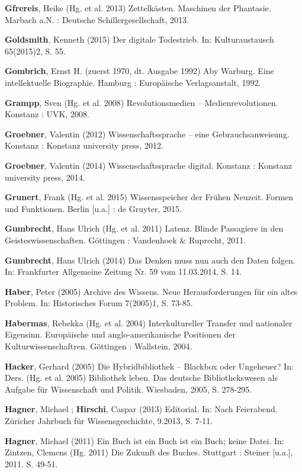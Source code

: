 \documentclass[a4paper,
fontsize=11pt,
oneside,
numbers=noperiodatend,
parskip=half-,
bibliography=totoc,
final
]{scrartcl}
\begin{document}
\textbf{Gfrereis}, Heike (Hg. et al. 2013) Zettelkästen. Maschinen der
Phantasie. Marbach a.N. : Deutsche Schillergesellschaft, 2013.

\textbf{Goldsmith}, Kenneth (2015) Der digitale Todestrieb. In:
Kulturaustausch 65(2015)2, S. 55.

\textbf{Gombrich}, Ernst H. (zuerst 1970, dt. Ausgabe 1992) Aby Warburg.
Eine intellektuelle Biographie. Hamburg : Europäische Verlagsanstalt,
1992.

\textbf{Grampp}, Sven (Hg. et al. 2008) Revolutionsmedien --
Medienrevolutionen. Konstanz : UVK, 2008.

\textbf{Groebner}, Valentin (2012) Wissenschaftssprache -- eine
Gebrauchsanweisung. Konstanz : Konstanz university press, 2012.

\textbf{Groebner}, Valentin (2014) Wissenschaftssprache digital.
Konstanz : Konstanz university press, 2014.

\textbf{Grunert}, Frank (Hg. et al. 2015) Wissensspeicher der Frühen
Neuzeit. Formen und Funktionen. Berlin {[}u.a.{]} : de Gruyter, 2015.

\textbf{Gumbrecht}, Hans Ulrich (Hg. et al. 2011) Latenz. Blinde
Passagiere in den Geisteswissenschaften. Göttingen : Vandenhoek \&
Ruprecht, 2011.

\textbf{Gumbrecht}, Hans Ulrich (2014) Das Denken muss nun auch den
Daten folgen. In: Frankfurter Allgemeine Zeitung Nr. 59 vom 11.03.2014,
S. 14.

\textbf{Haber}, Peter (2005) Archive des Wissens. Neue Herausforderungen
für ein altes Problem. In: Historisches Forum 7(2005)1, S. 73-85.

\textbf{Habermas}, Rebekka (Hg. et al. 2004) Interkultureller Transfer
und nationaler Eigensinn. Europäische und anglo-amerikanische Positionen
der Kulturwissenschaftren. Göttingen : Wallstein, 2004.

\textbf{Hacker}, Gerhard (2005) Die Hybridbibliothek -- Blackbox oder
Ungeheuer? In: Ders. (Hg. et al. 2005) Bibliothek leben. Das deutsche
Bibliothekswesen als Aufgabe für Wissenschaft und Politik. Wiesbaden,
2005, S. 278-295.

\textbf{Hagner}, Michael ; \textbf{Hirschi}, Caspar (2013) Editorial.
In: Nach Feierabend. Züricher Jahrbuch für Wissensgeschichte, 9.2013, S.
7-11.

\textbf{Hagner}, Michael (2011) Ein Buch ist ein Buch ist ein Buch;
keine Datei. In: Zintzen, Clemens (Hg. 2011) Die Zukunft des Buches.
Stuttgart : Steiner {[}u.a.{]}, 2011. S. 49-51.
\end{document}
